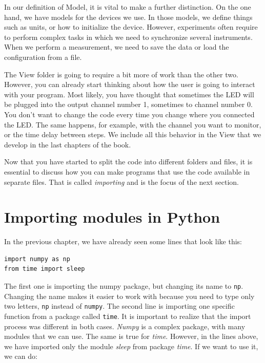 In our definition of Model, it is vital to make a further distinction. On the one hand, we have models for the devices we use. In those models, we define things such as units, or how to initialize the device. However, experiments often require to perform complex tasks in which we need to synchronize several instruments. When we perform a measurement, we need to save the data or load the configuration from a file.


The View folder is going to require a bit more of work than the other two. However, you can already start thinking about how the user is going to interact with your program. Most likely, you have thought that sometimes the {LED} will be plugged into the output channel number 1, sometimes to channel number 0. You don't want to change the code every time you change where you connected the LED. The same happens, for example, with the channel you want to monitor, or the time delay between steps. We include all this behavior in the View that we develop in the last chapters of the book.

Now that you have started to split the code into different folders and files, it is essential to discuss how you can make programs that use the code available in separate files. That is called \emph{importing} and is the focus of the next section.

\section{Importing modules in Python}\label{sec:importing-python}
In the previous chapter, we have already seen some lines that look like this:

\begin{verbatim}
import numpy as np
from time import sleep
\end{verbatim}

The first one is importing the numpy package, but changing its name to \texttt{np}. Changing the name makes it easier to work with because you need to type only two letters, \texttt{np} instead of \texttt{numpy}. The second line is importing one specific function from a package called \texttt{time}. It is important to realize that the import process was different in both cases. \emph{Numpy} is a complex package, with many modules that we can use. The same is true for \emph{time}. However, in the lines above, we have imported only the module \emph{sleep} from package \emph{time}. If we want to use it, we can do:

